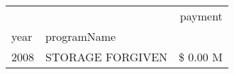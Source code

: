 \begin{tabular}{llr}
\toprule
 &  & payment \\
year & programName &  \\
\midrule
2008 & STORAGE FORGIVEN & \$ 0.00 M \\
\cline{1-3}
\bottomrule
\end{tabular}
